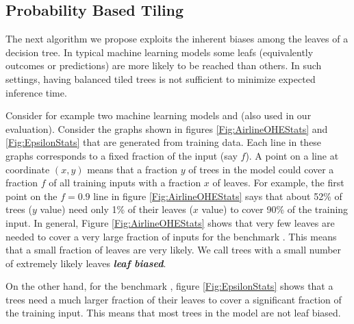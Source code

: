 \subsection{Probability Based Tiling}
\label{sec:ProbTiling}

The next algorithm we propose exploits the inherent biases among the leaves of a decision tree. In typical machine learning models some leafs (equivalently outcomes or predictions) are more likely to be reached than others. In such settings, having balanced tiled trees is not sufficient to minimize expected inference time. 

Consider for example two machine learning models  and  (also used in our evaluation). 
Consider the graphs shown in   
figures \ref{Fig:AirlineOHEStats} and \ref{Fig:EpsilonStats} that are generated from training data. Each line in these graphs corresponds to a fixed fraction of the input (say $f$). 
A point on a line at coordinate $(x, y)$ means that a fraction $y$ of trees in the model could cover a fraction $f$ of all training inputs with a fraction $x$ of 
leaves. For example, the first point on the $f=0.9$ line in figure \ref{Fig:AirlineOHEStats} says that about 52\% of trees ($y$ value) need only 1\% of their
leaves ($x$ value) to cover 90\% of the training input. 
In general, Figure \ref{Fig:AirlineOHEStats} shows that very few leaves are needed to cover a very large fraction of inputs for the benchmark . 
This means that a small fraction of leaves are very likely. 
We call trees with a small number of extremely likely leaves \textbf{\emph{leaf biased}}.

On the other hand, for the benchmark ,
figure \ref{Fig:EpsilonStats} shows that a trees need a much larger fraction of their leaves to cover a significant fraction of the training input.
This means that most trees in the  model are not leaf biased.

